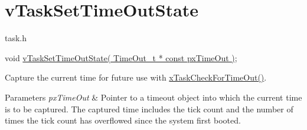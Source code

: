 \hypertarget{group__v_task_set_time_out_state}{}\section{v\+Task\+Set\+Time\+Out\+State}
\label{group__v_task_set_time_out_state}
task.\+h 
\begin{DoxyPre}
void \hyperlink{externals_2freertos_2include_2task_8h_a67155ad4ea2482b5f4597a69f2152be0}{vTaskSetTimeOutState( TimeOut\_t * const pxTimeOut )};
\end{DoxyPre}


Capture the current time for future use with \hyperlink{externals_2freertos_2include_2task_8h_a3b018a85d339e536a6c05748dd666a3a}{x\+Task\+Check\+For\+Time\+Out()}.


\begin{DoxyParams}{Parameters}
{\em px\+Time\+Out} & Pointer to a timeout object into which the current time is to be captured. The captured time includes the tick count and the number of times the tick count has overflowed since the system first booted. \\
\hline
\end{DoxyParams}

